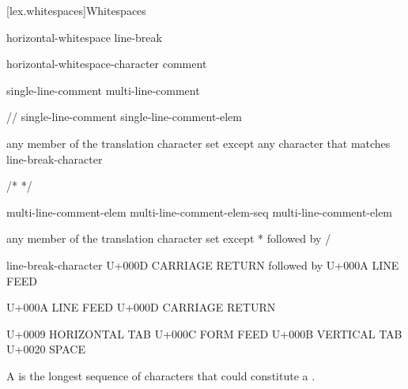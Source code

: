 \documentclass{wg21}
\begin{document}
\begin{addedblock}

[lex.whitespaces]{Whitespaces}

\begin{bnf}
    \br
    horizontal-whitespace\br
    line-break\br
\end{bnf}

\begin{bnf}
    \br
    horizontal-whitespace-character\br
    comment\br
\end{bnf}

\begin{bnf}
    \br
    single-line-comment\br
    multi-line-comment
\end{bnf}

\begin{bnf}
    \br
    \textnormal{//}\br
    single-line-comment single-line-comment-elem\br
\end{bnf}

\begin{bnf}
    \br
    \textnormal{any member of the translation character set except any character that matches} line-break-character\br
\end{bnf}

\begin{bnf}
    \br
    \textnormal{/*}   \textnormal{*/}\br
\end{bnf}

\begin{bnf}
    \br
    multi-line-comment-elem\br
    multi-line-comment-elem-seq multi-line-comment-elem    
\end{bnf}

\begin{bnf}
    \br
    \textnormal{any member of the translation character set except * followed by /}\br
\end{bnf}

\begin{bnf}
    \br
    line-break-character\br
    \textnormal{U+000D CARRIAGE RETURN followed by U+000A LINE FEED}\br
\end{bnf}

\begin{bnf}
    \br
    \textnormal{U+000A LINE FEED}\br
    \textnormal{U+000D CARRIAGE RETURN}\br
\end{bnf}

\begin{bnf}
    \br
    \textnormal{U+0009 HORIZONTAL TAB}\br
    \textnormal{U+000C FORM FEED}\br
    \textnormal{U+000B VERTICAL TAB}\br
    \textnormal{U+0020 SPACE}\br
\end{bnf}

A  is the longest sequence of characters that could constitute a .

\end{addedblock}
\end{document}
